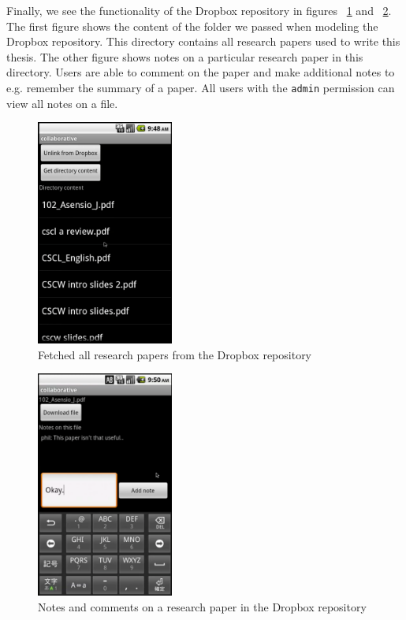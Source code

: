 Finally, we see the functionality of the Dropbox repository in figures ~\ref{fig:coll_dropbox1} and ~\ref{fig:coll_dropbox2}. The first figure shows the content of the folder we passed when modeling the Dropbox repository. This directory contains all research papers used to write this thesis. The other figure shows notes on a particular research paper in this directory. Users are able to comment on the paper and make additional notes to e.g. remember the summary of a paper. All users with the \texttt{admin} permission can view all notes on a file.
\begin{figure}[h!]
\centering
\includegraphics[width=0.4\textwidth]{images/chap7_dropbox1.png}
\caption{Fetched all research papers from the Dropbox repository}
\label{fig:coll_dropbox1}
\end{figure}
\begin{figure}[h!]
\centering
\includegraphics[width=0.4\textwidth]{images/chap7_dropbox2.png}
\caption{Notes and comments on a research paper in the Dropbox repository}
\label{fig:coll_dropbox2}
\end{figure}
